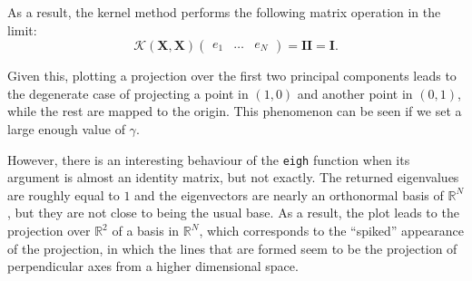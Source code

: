 \documentclass[11pt]{article}
\begin{document}
As a result, the kernel method performs the following matrix operation in the limit:
\[
      \mathcal{K}(\bm{X}, \bm{X})\begin{pmatrix} e_1 & \dots & e_N \end{pmatrix} = \bm{I}\bm{I} =  \bm{I}.
\]

Given this, plotting a projection over the first two principal components leads to the degenerate case of projecting a point in \( (1,0) \) and another point in \( (0,1) \), while the rest are mapped to the origin. This phenomenon can be seen if we set a large enough value of $\gamma$.

However, there is an interesting behaviour of the \texttt{eigh} function when its argument is almost an identity matrix, but not exactly. The returned eigenvalues are roughly equal to \( 1 \) and the eigenvectors are nearly an orthonormal basis of \( \mathbb{R}^N \), but they are not close to being the usual base. As a result, the plot leads to the projection over \( \mathbb{R}^2\) of a basis in \( \mathbb{R}^N \), which corresponds to the ``spiked''  appearance of the projection, in which the lines that are formed seem to be the projection of perpendicular axes from a higher dimensional space.
\end{document}
